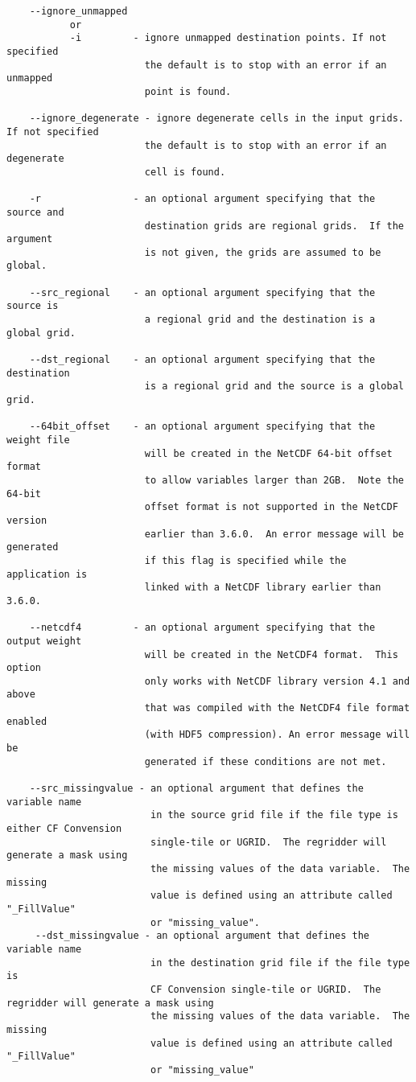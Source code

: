 \begin{verbatim}
    --ignore_unmapped
           or
           -i         - ignore unmapped destination points. If not specified
                        the default is to stop with an error if an unmapped
                        point is found.

    --ignore_degenerate - ignore degenerate cells in the input grids. If not specified
                        the default is to stop with an error if an degenerate
                        cell is found.

    -r                - an optional argument specifying that the source and
                        destination grids are regional grids.  If the argument
                        is not given, the grids are assumed to be global.

    --src_regional    - an optional argument specifying that the source is
                        a regional grid and the destination is a global grid.

    --dst_regional    - an optional argument specifying that the destination
                        is a regional grid and the source is a global grid.

    --64bit_offset    - an optional argument specifying that the weight file
                        will be created in the NetCDF 64-bit offset format
                        to allow variables larger than 2GB.  Note the 64-bit
                        offset format is not supported in the NetCDF version
                        earlier than 3.6.0.  An error message will be generated
                        if this flag is specified while the application is
                        linked with a NetCDF library earlier than 3.6.0.

    --netcdf4         - an optional argument specifying that the output weight
                        will be created in the NetCDF4 format.  This option 
                        only works with NetCDF library version 4.1 and above 
                        that was compiled with the NetCDF4 file format enabled 
                        (with HDF5 compression). An error message will be 
                        generated if these conditions are not met.

    --src_missingvalue - an optional argument that defines the variable name 
                         in the source grid file if the file type is either CF Convension
                         single-tile or UGRID.  The regridder will generate a mask using 
                         the missing values of the data variable.  The missing 
                         value is defined using an attribute called "_FillValue" 
                         or "missing_value". 
     --dst_missingvalue - an optional argument that defines the variable name
                         in the destination grid file if the file type is
                         CF Convension single-tile or UGRID.  The regridder will generate a mask using
                         the missing values of the data variable.  The missing
                         value is defined using an attribute called "_FillValue"
                         or "missing_value"


\end{verbatim}
